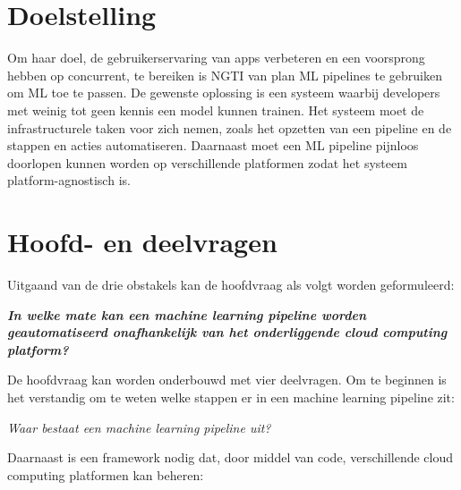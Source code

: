 
\section{Doelstelling}\label{sec:ch2-doelstelling}
Om haar doel, de gebruikerservaring van apps verbeteren en een voorsprong hebben op concurrent, te bereiken is NGTI van plan ML pipelines te gebruiken om ML toe te passen. De gewenste oplossing is een systeem waarbij developers met weinig tot geen kennis een model kunnen trainen. Het systeem moet de infrastructurele taken voor zich nemen, zoals het opzetten van een pipeline en de stappen en acties automatiseren. Daarnaast moet een ML pipeline pijnloos doorlopen kunnen worden op verschillende platformen zodat het systeem platform-agnostisch is.

\section{Hoofd- en deelvragen}\label{sec:ch2-hoofd-en-deelvragen}
Uitgaand van de drie obstakels kan de hoofdvraag als volgt worden geformuleerd:

\begin{quoting}
  \begin{center}
    \textbf{
      \textit{
        In welke mate kan een machine learning pipeline worden geautomatiseerd onafhankelijk van het onderliggende cloud computing platform?
      }
    }
  \end{center}
\end{quoting}\smallskip

De hoofdvraag kan worden onderbouwd met vier deelvragen. Om te beginnen is het verstandig om te weten welke stappen er in een machine learning pipeline zit:

\begin{quoting}
  \begin{center}
    \textit{
      Waar bestaat een machine learning pipeline uit?
    }
  \end{center}
\end{quoting}\smallskip

Daarnaast is een framework nodig dat, door middel van code, verschillende cloud computing platformen kan beheren:

